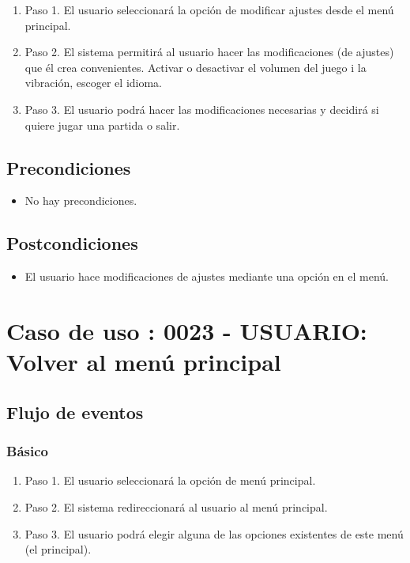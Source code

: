 \begin{enumerate}
\item Paso 1.
El usuario seleccionará la opción de modificar ajustes desde el menú principal. 
\item Paso 2.
El sistema permitirá al usuario hacer las modificaciones (de ajustes) que él crea convenientes. Activar o desactivar el volumen del juego i la vibración, escoger el idioma.
\item Paso 3.
El usuario podrá hacer las modificaciones necesarias y decidirá si quiere jugar una partida o salir.
\end{enumerate}

\subsection{Precondiciones}
\begin{itemize}
\item No hay precondiciones.
\end{itemize}

\subsection{Postcondiciones}
\begin{itemize}
\item El usuario hace modificaciones de ajustes mediante una opción en el menú.
\end{itemize}



\section{Caso de uso : 0023 - USUARIO: Volver al menú principal}\label{sec:uc0}
\subsection{Flujo de eventos}
\subsubsection{Básico}

\begin{enumerate}
\item Paso 1.
El usuario seleccionará la opción de menú principal. 
\item Paso 2.
El sistema redireccionará al usuario al menú principal. 
\item Paso 3.
El usuario podrá elegir alguna de las opciones existentes de este menú (el principal).
\end{enumerate}

